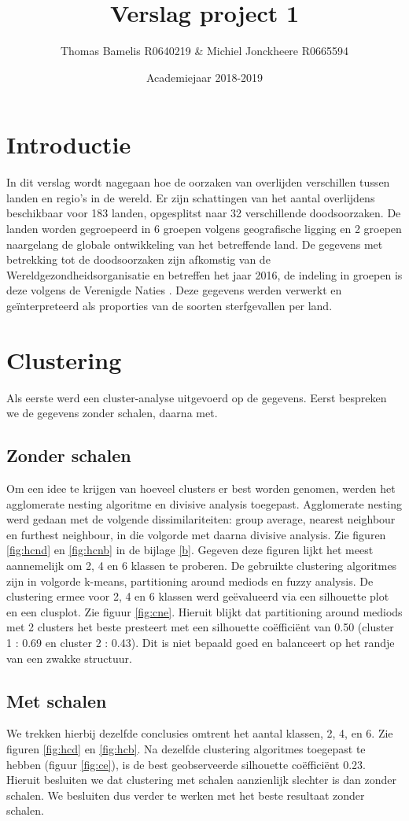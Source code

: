 \documentclass[a4paper,kulak]{kulakarticle}
\date{Academiejaar 2018-2019}
\title{Verslag project 1}
\author{Thomas Bamelis R0640219 \& Michiel Jonckheere R0665594}
\begin{document}
\maketitle

\tableofcontents
\newpage
\section*{Introductie}
In dit verslag wordt nagegaan hoe de oorzaken van overlijden verschillen tussen landen en regio's in
de wereld. Er zijn schattingen van het aantal overlijdens beschikbaar voor 183 landen,
opgesplitst naar 32 verschillende doodsoorzaken. De landen worden gegroepeerd in 6 groepen volgens
geografische ligging en 2 groepen naargelang de globale ontwikkeling van het betreffende land. De gegevens
met betrekking tot de doodsoorzaken zijn afkomstig van de Wereldgezondheidsorganisatie \cite{ghe} en betreffen
het jaar 2016, de indeling in groepen is deze volgens de Verenigde Naties \cite{vn}. 
Deze gegevens werden verwerkt en geïnterpreteerd als proporties van de soorten sterfgevallen per land.

\section{Clustering}
Als eerste werd een cluster-analyse uitgevoerd op de gegevens. Eerst bespreken we de gegevens zonder schalen, daarna met.
\subsection{Zonder schalen}
Om een idee te krijgen van hoeveel clusters er best worden genomen, werden het agglomerate nesting algoritme en divisive analysis toegepast.
Agglomerate nesting werd gedaan met de volgende dissimilariteiten: group average, nearest neighbour en furthest neighbour, in die volgorde met daarna divisive analysis.
Zie figuren \ref{fig:hcnd} en \ref{fig:hcnb} in de bijlage \ref{b}.
Gegeven deze figuren lijkt het meest aannemelijk om 2, 4 en 6 klassen te proberen.
De gebruikte clustering algoritmes zijn in volgorde k-means, partitioning around mediods en fuzzy analysis.
De clustering ermee voor 2, 4 en 6 klassen werd geëvalueerd via een silhouette plot en een clusplot.
Zie figuur \ref{fig:cne}.
Hieruit blijkt dat partitioning around mediods met 2 clusters het beste presteert met een silhouette coëfficiënt van 0.50 (cluster 1 : 0.69 en cluster 2 : 0.43).
Dit is niet bepaald goed en balanceert op het randje van een zwakke structuur.
\subsection{Met schalen}
 We trekken hierbij dezelfde conclusies omtrent het aantal klassen, 2, 4, en 6.
 Zie figuren \ref{fig:hcd} en \ref{fig:hcb}.
 Na dezelfde clustering algoritmes toegepast te hebben (figuur \ref{fig:ce}), is de best geobserveerde silhouette coëfficiënt 0.23.
 Hieruit besluiten we dat clustering met schalen aanzienlijk slechter is dan zonder schalen.
 We besluiten dus verder te werken met het beste resultaat zonder schalen.
\end{document}
